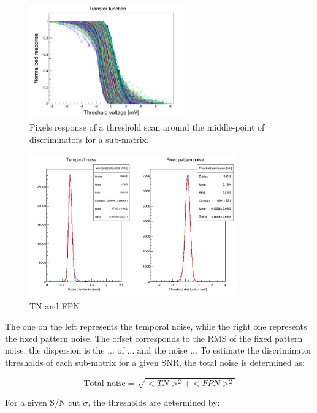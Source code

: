   \begin{figure}
    \centering
    \includegraphics[width=0.6\textwidth]{Pictures/labTests/transfer_B.png}
    \caption{Pixels response of a threshold scan around the middle-point of discriminators for a sub-matrix.}
    \label{fig:transfer}
  \end{figure}

  \begin{figure}
    \centering
    \includegraphics[width=0.8\textwidth]{Pictures/labTests/noise_A.png}
    \caption{TN and FPN}
    \label{fig:TN&FPN}
  \end{figure}

  The one on the left represents the temporal noise, while the right one represents the fixed pattern noise.
  The offset corresponds to the RMS of the fixed pattern noise, the dispersion is the ... of ... and the noise ...
  To estimate the discriminator thresholds of each sub-matrix for a given \gls{SNR}, the total noise is determined as:
  
  \begin{equation}
    \text{Total noise} = \sqrt{<TN>^2 + <FPN>^2}
  \end{equation}

  For a given S/N cut $\sigma$, the thresholds are determined by:

